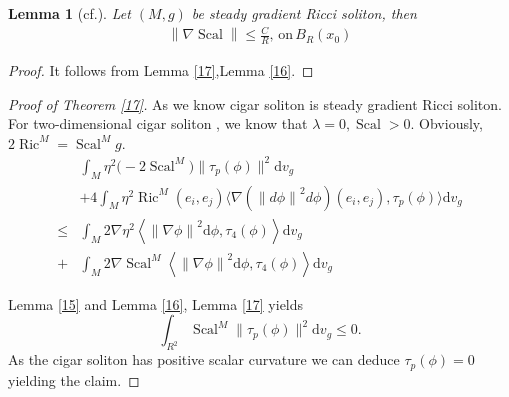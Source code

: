 \documentclass[12pt,UTF8]{article}
\theoremstyle{plain}
\newtheorem{lem}{Lemma}
\theoremstyle{definition}
\def\d {\mathrm{d}}
\def\na{\ensuremath{\nabla}}
\renewcommand{\d}[1]{\mathbb{#1}}
\renewcommand{\(}{\left(}
\renewcommand{\)}{\right)}
\renewcommand{\leq}{\leqslant}
\DeclareMathOperator*{\Scal}{Scal}
\newcommand{\norm}[1]{\left\lVert#1\right\rVert}%
\numberwithin{equation}{subsection}
\def\na{\nabla}
\newcommand{\dv}{\operatorname{div}}
\renewcommand{\leq}{\leqslant}
\renewcommand{\(}{\left(}
\renewcommand{\)}{\right)}
\def\d{\mathrm{d}}
\def \d {\mathrm{d}}
\def\la{\lambda}
\def\dv{\d v_g}
\numberwithin{equation}{section}
\begin{document}
\begin{lem}[cf.\cite{MR954419}]\label{32}
	Let $(M,g)$ be steady gradient Ricci soliton, then
	\begin{equation}
		\begin{split}
			\norm{\na \Scal} \leq  \frac{C}{R}, \, \text{on}\, B_R(x_0)
		\end{split}
	\end{equation}
\end{lem}
\begin{proof}
	It follows from Lemma \ref{17},Lemma \ref{16}.
\end{proof}

\begin{proof}[Proof of Theorem \ref{17}]
	As we know cigar soliton is steady gradient Ricci soliton.
For two-dimensional cigar soliton	, we know that $\la=0,\Scal>0$. Obviously, $2\operatorname{Ric}^M=\operatorname{Scal}^Mg$.
	\begin{equation}
	\begin{split}
		&\int_M\eta^2\big(-2\operatorname{Scal}^M\big)\|\tau_p(\phi)\|^2\dv\\
		&+
		4\int_M\eta^2\operatorname{Ric}^M(e_i,e_j)\langle\na \left(\norm{d\phi}^{2} d\phi \right)(e_i,e_j),\tau_p(\phi)\rangle \dv \\
		\leq  &\int_M 2\na\eta^2\left\langle \norm{\na \phi}^2\d \phi, \tau_4(\phi) \right\rangle \dv\\ 
		+&\int_M 2\na\Scal^M\left\langle \norm{\na \phi}^2\d \phi, \tau_4(\phi) \right\rangle \dv
	\end{split}
\end{equation}

Lemma \ref{15} and Lemma \ref{16}, Lemma \ref{17} yields
\begin{equation*}
	\int_{R^2}\operatorname{Scal}^M\|\tau_p(\phi)\|^2\dv\leq 0.
\end{equation*}
As the cigar soliton has positive scalar curvature we can deduce $\tau_p(\phi)=0$
yielding the claim.
\end{proof}

	
	

	
	
	
\end{document}
